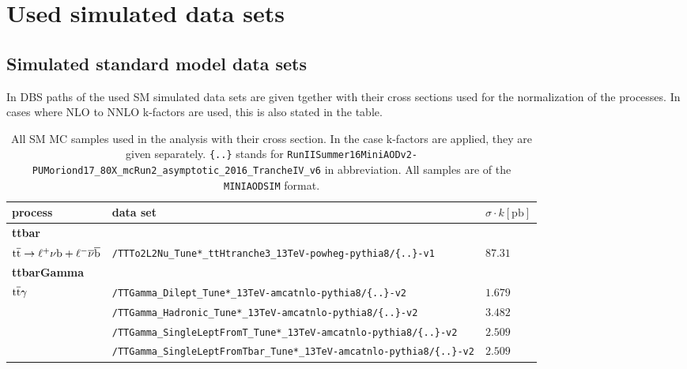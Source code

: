 \chapter{Used simulated data sets}
\section*{Simulated standard model data sets}

In  DBS paths of the used SM simulated data sets are given tgether with their cross sections used for the normalization of the processes. In cases where NLO to NNLO k-factors are used, this is also stated in the table.

\begin{table}[tb]
 \centering
 \caption{All SM MC samples used in the analysis with their cross section. In the case k-factors are applied, they are given separately. \texttt{\{..\}} stands for \texttt{RunIISummer16MiniAODv2-PUMoriond17\_80X\_mcRun2\_asymptotic\_2016\_TrancheIV\_v6} in abbreviation. All samples are of the \texttt{MINIAODSIM} format.}
 \scriptsize
 \label{tab:app_MCsets}
 \begin{tabular}[width=\textwidth]{lll}
  \hline
  \normalsize{process}                             & \normalsize{data set}   & \normalsize{$\sigma\cdot k[\mathrm{pb}]$} \\\hline
  \scriptsize{\textbf{ttbar}}                      &                         &                                           \\
  ${\mathrm{t}\overline{\mathrm{t}}}\to\ell^{+}\nu\mathrm{b}+\ell^{-}\overline{\nu}\overline{\mathrm{b}}$ & \verb|/TTTo2L2Nu_Tune*_ttHtranche3_13TeV-powheg-pythia8/{..}-v1|  & $87.31$                                   \\
  \scriptsize{\textbf{ttbarGamma}}                 &                         &                                           \\
  ${\mathrm{t}\overline{\mathrm{t}}}\gamma$                                     & \verb|/TTGamma_Dilept_Tune*_13TeV-amcatnlo-pythia8/{..}-v2| & $1.679$                                   \\
                                                   & \verb|/TTGamma_Hadronic_Tune*_13TeV-amcatnlo-pythia8/{..}-v2| & $3.482$                                   \\
                                                   & \verb|/TTGamma_SingleLeptFromT_Tune*_13TeV-amcatnlo-pythia8/{..}-v2| & $2.509$                                   \\
                                                   & \verb|/TTGamma_SingleLeptFromTbar_Tune*_13TeV-amcatnlo-pythia8/{..}-v2| & $2.509$                                   \\

\end{tabular}
\end{table}
